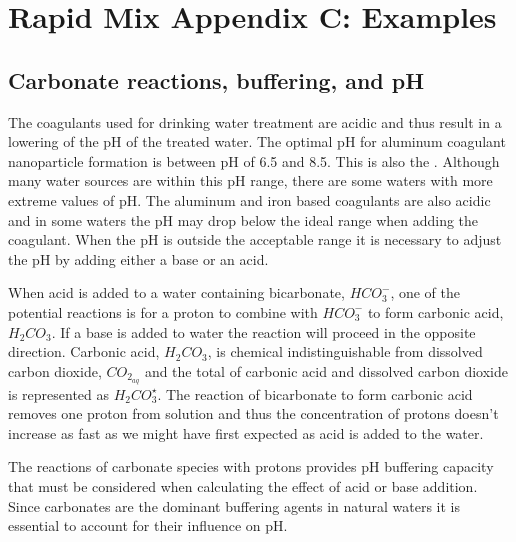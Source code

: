 \documentclass[letterpaper,10pt,english]{sphinxmanual}
\begin{document}
\chapter{Rapid Mix Appendix C: Examples}
\label{\detokenize{Rapid_Mix/RM_Examples:rapid-mix-appendix-c-examples}}\label{\detokenize{Rapid_Mix/RM_Examples:title-rapid-mix-examples}}\label{\detokenize{Rapid_Mix/RM_Examples::doc}}

\section{Carbonate reactions, buffering, and pH}
\label{\detokenize{Rapid_Mix/RM_Examples:carbonate-reactions-buffering-and-ph}}\label{\detokenize{Rapid_Mix/RM_Examples:heading-carbonate-reactions-buffering-and-ph}}
The coagulants used for drinking water treatment are acidic and thus result in a lowering of the pH of the treated water. The optimal pH for aluminum coagulant nanoparticle formation is between pH of 6.5 and 8.5. This is also the . Although many water sources are within this pH range, there are some waters with more extreme values of pH. The aluminum and iron based coagulants are also acidic and in some waters the pH may drop below the ideal range when adding the coagulant. When the pH is outside the acceptable range it is necessary to adjust the pH by adding either a base or an acid.

When acid is added to a water containing bicarbonate, \(HCO_3^-\), one of the potential reactions is for a proton to combine with \(HCO_3^-\) to form carbonic acid, \({H_2}CO_3\). If a base is added to water the reaction will proceed in the opposite direction. Carbonic acid, \({H_2}CO_3\), is chemical indistinguishable from dissolved carbon dioxide, \(CO_{2_{aq}}\) and the total of carbonic acid and dissolved carbon dioxide is represented as \({H_2}CO_3^{\star}\). The reaction of bicarbonate to form carbonic acid removes one proton from solution and thus the concentration of protons doesn’t increase as fast as we might have first expected as acid is added to the water.

The reactions of carbonate species with protons provides pH buffering capacity that must be considered when calculating the effect of acid or base addition. Since carbonates are the dominant buffering agents in natural waters it is essential to account for their influence on pH.
\end{document}
